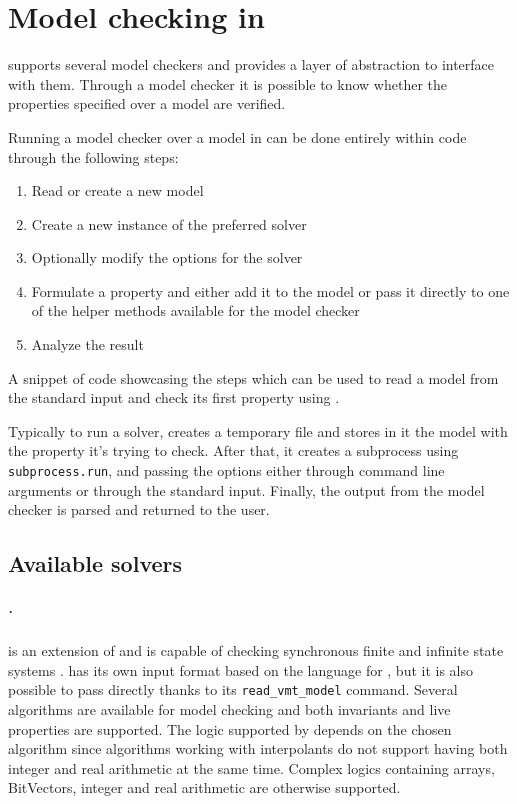 \chapter{Model checking in \pyvmt{}}
\label{ch:model-checking}
\pyvmt{} supports several model checkers and provides a layer of abstraction to interface with them. Through a model checker it is possible to know whether the properties specified over a model are verified.

Running a model checker over a model in \pyvmt{} can be done entirely within \python{} code through the following steps:
\begin{enumerate}
    \item Read or create a new model
    \item Create a new instance of the preferred solver
    \item Optionally modify the options for the solver
    \item Formulate a property and either add it to the model or pass it directly to one of the helper methods available for the model checker
    \item Analyze the result
\end{enumerate}

\begin{listing}[h]
    \label{alg:model-checking-steps}
    \caption{A snippet of code showcasing the steps which can be used to read a model from the standard input and check its first property using \iceia{}.}
\end{listing}

Typically to run a solver, \pyvmt{} creates a temporary file and stores in it the model with the property it's trying to check.
After that, it creates a subprocess using \texttt{subprocess.run}, and passing the options either through command line arguments or through the standard input.
Finally, the output from the model checker is parsed and returned to the user.

\section{Available solvers}

\paragraph*{\nuxmv{}.}
\nuxmv{} is an extension of \nusmv{} and is capable of checking synchronous finite and infinite state systems \cite{DBLP:conf/cav/CavadaCDGMMMRT14}.
\nuxmv{} has its own input format based on the language for \nusmv{}, but it is also possible to pass directly \vmtlib{} thanks to its \texttt{read\_vmt\_model} command.
Several algorithms are available for model checking and both invariants and live properties are supported.
The logic supported by \nuxmv{} depends on the chosen algorithm since algorithms working with interpolants do not support having both integer and real arithmetic at the same time.
Complex logics containing arrays, BitVectors, integer and real arithmetic are otherwise supported.

